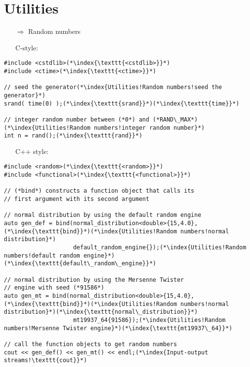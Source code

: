 \documentclass[10pt]{book}
\begin{document}
\section{Utilities}
\begin{enumerate}
\item[$\Rightarrow$] Random numbers
\end{enumerate}
\begin{enumerate}
\item[] C-style:
\end{enumerate}
\begin{lstlisting}
#include <cstdlib>(*\index{\texttt{<cstdlib>}}*)
#include <ctime>(*\index{\texttt{<ctime>}}*)

// seed the generator(*\index{Utilities!Random numbers!seed the generator}*)
srand( time(0) );(*\index{\texttt{srand}}*)(*\index{\texttt{time}}*)

// integer random number between (*0*) and (*RAND\_MAX*)(*\index{Utilities!Random numbers!integer random number}*)
int n = rand();(*\index{\texttt{rand}}*)
\end{lstlisting}
\begin{enumerate}
\item[] C++ style:
\end{enumerate}
\begin{lstlisting}
#include <random>(*\index{\texttt{<random>}}*)
#include <functional>(*\index{\texttt{<functional>}}*)

// (*bind*) constructs a function object that calls its
// first argument with its second argument

// normal distribution by using the default random engine
auto gen_def = bind(normal_distribution<double>{15,4.0},(*\index{\texttt{bind}}*)(*\index{Utilities!Random numbers!normal distribution}*)
                    default_random_engine{});(*\index{Utilities!Random numbers!default random engine}*)(*\index{\texttt{default\_random\_engine}}*)
                    
// normal distribution by using the Mersenne Twister
// engine with seed (*91586*)                  
auto gen_mt = bind(normal_distribution<double>{15,4.0},(*\index{\texttt{bind}}*)(*\index{Utilities!Random numbers!normal distribution}*)(*\index{\texttt{normal\_distribution}}*)
                    mt19937_64{91586});(*\index{Utilities!Random numbers!Mersenne Twister engine}*)(*\index{\texttt{mt19937\_64}}*)

// call the function objects to get random numbers
cout << gen_def() << gen_mt() << endl;(*\index{Input-output streams!\texttt{cout}}*)
\end{lstlisting}
\end{document}

